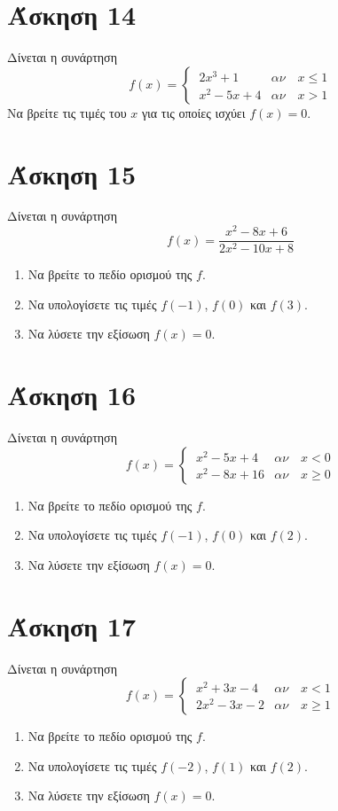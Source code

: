 \documentclass[a4paper,10pt]{report}
\begin{document}
\section*{Άσκηση 14  \hfill \small{}}
Δίνεται η συνάρτηση 
$$ f(x)=\begin{cases} 
                \ 2x^{3}+1   & αν\quad x\le 1 \\
                  \ x^{2}-5x+4     & αν\quad x>1
               \end{cases} $$
Να βρείτε τις τιμές του $x$ για  τις οποίες ισχύει $f(x)=0$.


\section*{Άσκηση 15  \hfill \small{}}
Δίνεται η συνάρτηση 
$$ f(x)=\dfrac{x^{2}-8x+6}{2x^{2}-10x+8} $$
\begin{enumerate}[1)]
\item Να βρείτε το πεδίο ορισμού της $f$.
\item Να υπολογίσετε τις τιμές $f(-1)$, $f(0)$ και $f(3)$.
\item Να λύσετε την εξίσωση $f(x)=0$.
\end{enumerate}


\section*{Άσκηση 16  \hfill \small{}}
Δίνεται η συνάρτηση 
$$ f(x)=\begin{cases} 
                \ x^{2}-5x+4   & αν\quad x<0 \\
                  \ x^{2}-8x+16     & αν\quad x\ge0
               \end{cases} $$
\begin{enumerate}[1)]
\item Να βρείτε το πεδίο ορισμού της $f$.
\item Να υπολογίσετε τις τιμές $f(-1)$, $f(0)$ και $f(2)$.
\item Να λύσετε την εξίσωση $f(x)=0$.
\end{enumerate}


\section*{Άσκηση 17  \hfill \small{}}
Δίνεται η συνάρτηση 
$$ f(x)=\begin{cases} 
                \ x^{2}+3x-4   & αν\quad x<1 \\
                  \ 2x^{2}-3x-2     & αν\quad x\ge 1
               \end{cases} $$
\begin{enumerate}[1)]
\item Να βρείτε το πεδίο ορισμού της $f$.
\item Να υπολογίσετε τις τιμές $f(-2)$, $f(1)$ και $f(2)$.
\item Να λύσετε την εξίσωση $f(x)=0$.
\end{enumerate}
\end{document}
